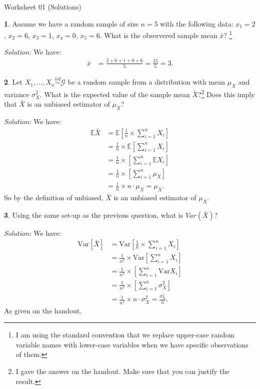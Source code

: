 \documentclass{tufte-handout}
\newcommand{\E}{\mathbb{E}}
\newcommand{\V}{\text{Var}}
\newcommand{\iid}{\stackrel{iid}{\sim}}
\begin{document}
\justify

{\LARGE Worksheet 01 (Solutions)}

\vspace*{18pt}


\textbf{1}. Assume we have a random sample of size $n = 5$ with the following data:
$x_1 = 2$, $x_2 = 6$, $x_3 = 1$, $x_4 = 0$, $x_5 = 6$. What is the observered
sample mean $\bar{x}$? 
\footnote{
  I am using the standard convention that we replace upper-case random 
  variable names with lower-case variables when we have specific 
  observations of them. 
}

\textit{Solution:} We have:
\begin{align*}
\bar{x} &= \frac{2 + 6 + 1 + 0 + 6}{5} = \frac{15}{5} = 3.
\end{align*}

\textbf{2}. Let $X_1, \ldots, X_n \iid \mathcal{G}$ be a random sample from a distribution
with mean $\mu_X$ and variance $\sigma^2_X$. What is the expected value of the
sample mean $\bar{X}$?\footnote{
  I gave the answer on the handout. Make sure that you can justify
  the result.
} Does this imply that $\bar{X}$ is an unbiased estimator of $\mu_X$?

\textit{Solution:} We have:
\begin{align*}
\E \bar{X} &= \E \left[ \frac{1}{n} \times \sum_{i=1}^n X_i \right] \\
&= \frac{1}{n} \times \E \left[ \sum_{i=1}^n X_i \right] \\
&= \frac{1}{n} \times \left[ \sum_{i=1}^n \E X_i \right] \\
&= \frac{1}{n} \times \left[ \sum_{i=1}^n \mu_X \right] \\
&= \frac{1}{n} \times n \cdot \mu_X = \mu_X.
\end{align*}
So by the definition of unbiased, $\bar{X}$ is an unbiased estimator of $\mu_X$.

\textbf{3}. Using the same set-up as the previous question, what is $Var(\bar{X})$?

\textit{Solution:} We have:
\begin{align*}
\V [\bar{X}] &= \V \left[ \frac{1}{n} \times \sum_{i=1}^n X_i \right] \\
&= \frac{1}{n^2} \times \V \left[ \sum_{i=1}^n X_i \right] \\
&= \frac{1}{n^2} \times \left[ \sum_{i=1}^n \V X_i \right] \\
&= \frac{1}{n^2} \times \left[ \sum_{i=1}^n \sigma_X^2 \right] \\
&= \frac{1}{n^2} \times n \cdot \sigma_X^2 = \frac{\sigma_X^2}{n}.
\end{align*}
As given on the handout.
\end{document}

